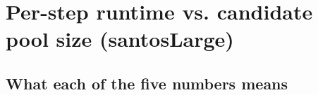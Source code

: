 %
%
%
%

\section{Per-step runtime vs. candidate pool size (santosLarge)}

\subsection{What each of the five numbers means}

